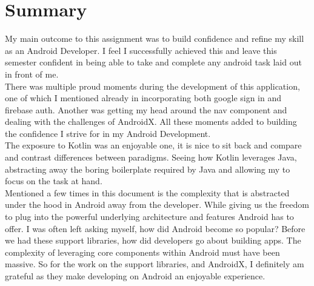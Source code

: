 \section{Summary}
My main outcome to this assignment was to build confidence and refine my skill as an Android Developer. I feel I successfully achieved this and leave this semester confident in being able to take and complete any android task laid out in front of me.
\\There was multiple proud moments during the development of this application, one of which I mentioned already in incorporating both google sign in and firebase auth. Another was getting my head around the nav component and dealing with the challenges of AndroidX. All these moments added to building the confidence I strive for in my Android Development. 
\\The exposure to Kotlin was an enjoyable one, it is nice to sit back and compare and contrast differences between paradigms. Seeing how Kotlin leverages Java, abstracting away the boring boilerplate required by Java and allowing my to focus on the task at hand.
\\Mentioned a few times in this document is the complexity that is abstracted under the hood in Android away from the developer. While giving us the freedom to plug into the powerful underlying architecture and features Android has to offer. I was often left asking myself, how did Android become so popular? Before we had these support libraries, how did developers go about building apps. The complexity of leveraging core components within Android must have been massive. So for the work on the support libraries, and AndroidX, I definitely am grateful as they make developing on Android an enjoyable experience. 